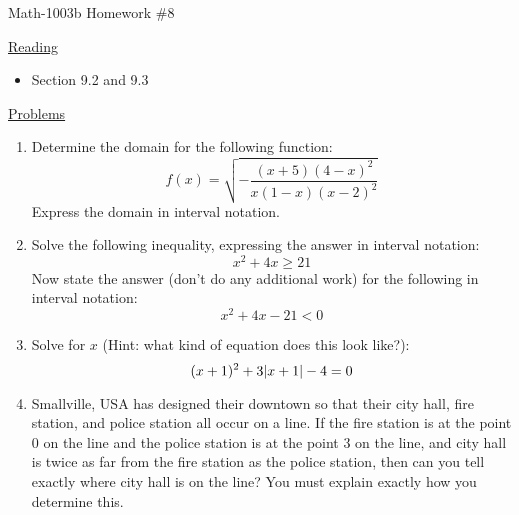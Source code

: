 \documentclass[letterpaper,12pt,fleqn]{article}
\begin{document}
\begin{center}
\Large Math-1003b Homework \#8
\end{center}

\vspace{0.5in}

\underline{Reading}

\bigskip

\begin{itemize}
\item Section 9.2 and 9.3
\end{itemize}

\bigskip

\underline{Problems}

\bigskip

\begin{enumerate}
\item Determine the domain for the following function:
  \[f(x)=\sqrt{-\frac{(x+5)(4-x)^2}{x(1-x)(x-2)^2}}\]
  Express the domain in interval notation.

\item Solve the following inequality, expressing the answer in interval
  notation:
  \[x^2+4x\ge 21\]
  Now state the answer (don't do any additional work) for the following in
  interval notation:
  \[x^2+4x-21<0\]

\item Solve for $x$ (Hint: what kind of equation does this look like?):
  \[(x+1)^2+3\lvert x+1\rvert-4=0\]

\item Smallville, USA has designed their downtown so that their city hall,
  fire station, and police station all occur on a line. If the fire station
  is at the point 0 on the line and the police station is at the point 3 on
  the line, and city hall is twice as far from the fire station as the police
  station, then can you tell exactly where city hall is on the line? You must
  explain exactly how you determine this.
\end{enumerate}
\end{document}

